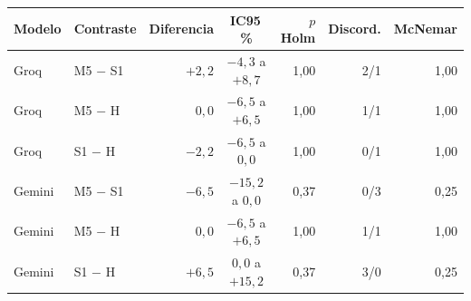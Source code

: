 \setlength{\tabcolsep}{4.5pt}\begin{tabular}{llrcrrr}\toprule
Modelo & Contraste & Diferencia & IC95\,\% & $p$ Holm & Discord. & McNemar \\ \midrule
Groq & M5 $-$ S1 & $+2,2$ & $-4,3$ a $+8,7$ & 1,00 & 2/1 & 1,00 \\
Groq & M5 $-$ H & $0,0$ & $-6,5$ a $+6,5$ & 1,00 & 1/1 & 1,00 \\
Groq & S1 $-$ H & $-2,2$ & $-6,5$ a $0,0$ & 1,00 & 0/1 & 1,00 \\
Gemini & M5 $-$ S1 & $-6,5$ & $-15,2$ a $0,0$ & 0,37 & 0/3 & 0,25 \\
Gemini & M5 $-$ H & $0,0$ & $-6,5$ a $+6,5$ & 1,00 & 1/1 & 1,00 \\
Gemini & S1 $-$ H & $+6,5$ & $0,0$ a $+15,2$ & 0,37 & 3/0 & 0,25 \\
\bottomrule\end{tabular}
